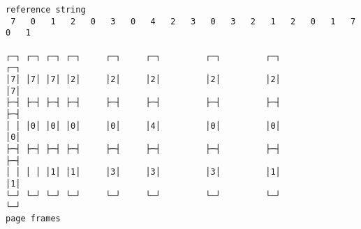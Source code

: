 \documentclass[varwidth=20cm,crop]{standalone}
\begin{document}
\begin{verbatim}
reference string
 7   0   1   2   0   3   0   4   2   3   0   3   2   1   2   0   1   7   0   1

┌─┐ ┌─┐ ┌─┐ ┌─┐     ┌─┐     ┌─┐         ┌─┐         ┌─┐             ┌─┐
│7│ │7│ │7│ │2│     │2│     │2│         │2│         │2│             │7│
├─┤ ├─┤ ├─┤ ├─┤     ├─┤     ├─┤         ├─┤         ├─┤             ├─┤
│ │ │0│ │0│ │0│     │0│     │4│         │0│         │0│             │0│
├─┤ ├─┤ ├─┤ ├─┤     ├─┤     ├─┤         ├─┤         ├─┤             ├─┤
│ │ │ │ │1│ │1│     │3│     │3│         │3│         │1│             │1│
└─┘ └─┘ └─┘ └─┘     └─┘     └─┘         └─┘         └─┘             └─┘
page frames
\end{verbatim}
\end{document}

